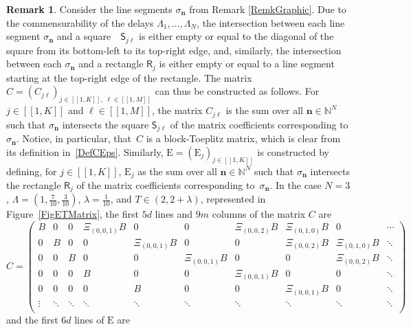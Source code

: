 \documentclass[JEP,XML,SOM,Unicode]{cedram}
\newcommand{\bn}{\boldsymbol{n}}
\newcommand{\llbracket}{[\![}
\newcommand{\rrbracket}{]\!]}
\theoremstyle{plain}
\theoremstyle{definition}
\newtheorem{remk}[theo]{Remark}
\newcommand{\Epsilon}{\mathrm E}
\begin{document}
\begin{remk}
Consider the line segments $\sigma_{\bn}$ from Remark \ref{RemkGraphic}. Due to the commensurability of the delays $\Lambda_1, \dots, \Lambda_N$, the intersection between each line segment $\sigma_{\bn}$ and a square~ $\mathsf S_{j\ell}$ is either empty or equal to the diagonal of the square from its bottom-left to its top-right edge, and, similarly, the intersection between each $\sigma_{\bn}$ and a rectangle $\mathsf R_j$ is either empty or equal to a line segment starting at the top-right edge of the rectangle. The matrix $C = \left(C_{j\ell}\right)_{j \in \llbracket 1, K\rrbracket,\; \ell \in \llbracket 1, M\rrbracket}$ can thus be constructed as follows. For \hbox{$j \in \llbracket 1, K\rrbracket$} and $\ell \in \llbracket 1, M\rrbracket$, the matrix $C_{j\ell}$ is the sum over all $\bn \in \mathbb N^N$ such that $\sigma_{\bn}$ intersects the square $\mathsf S_{j\ell}$ of the matrix coefficients corresponding to $\sigma_{\bn}$. Notice, in particular, that~$C$ is a block-Toeplitz matrix, which is clear from its definition in~\eqref{DefCEps}. Similarly, $\Epsilon = \left(\Epsilon_j\right)_{j \in \llbracket 1, K\rrbracket}$ is constructed by defining, for $j \in \llbracket 1, K\rrbracket$, $\Epsilon_j$ as the sum over all \hbox{$\bn \in \mathbb N^N$} such that $\sigma_{\bn}$ intersects the rectangle $\mathsf R_{j}$ of the matrix coefficients corresponding to~$\sigma_{\bn}$. In the case $N = 3$, $\Lambda = \left(1, \frac{7}{10}, \frac{3}{10}\right)$, $\lambda = \frac{1}{10}$, and $T \in (2, 2 + \lambda)$, represented in Figure~\ref{FigETMatrix}, the first $5d$ lines and $9m$ columns of the matrix $C$ are
\begin{equation*}
C =
\begin{pmatrix}
B & 0 & 0 & \Xi_{(0, 0, 1)} B & 0 & 0 & \Xi_{(0, 0, 2)} B & \Xi_{(0, 1, 0)} B & 0 & \cdots \\
0 & B & 0 & 0 & \Xi_{(0, 0, 1)} B & 0 & 0 & \Xi_{(0, 0, 2)} B & \Xi_{(0, 1, 0)} B & \ddots \\
0 & 0 & B & 0 & 0 & \Xi_{(0, 0, 1)} B & 0 & 0 & \Xi_{(0, 0, 2)} B & \ddots \\
0 & 0 & 0 & B & 0 & 0 & \Xi_{(0, 0, 1)} B & 0 & 0 & \ddots \\
0 & 0 & 0 & 0 & B & 0 & 0 & \Xi_{(0, 0, 1)} B & 0 & \ddots \\
\vdots & \ddots & \ddots & \ddots & \ddots & \ddots & \ddots & \ddots & \ddots & \ddots \\
\end{pmatrix}
\end{equation*}
and the first $6d$ lines of $\Epsilon$ are

\end{remk}
\end{document}
